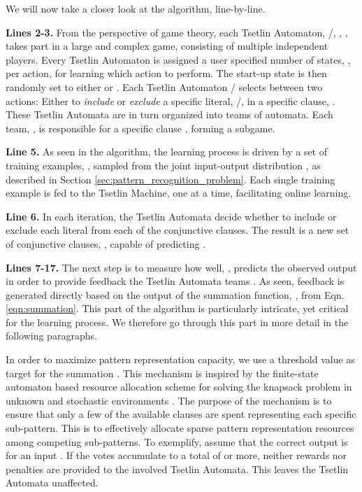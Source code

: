 \documentclass[11pt,a4paper]{article}
\begin{document}
We will now take a closer look at the algorithm, line-by-line.

{\bf Lines 2-3.} From the perspective of game theory, each Tsetlin Automaton, /, , , takes part in a large and complex game, consisting of multiple independent players. Every Tsetlin Automaton is assigned a user specified number of states, , per action, for learning which action to perform. The start-up state is then randomly set to either  or . Each Tsetlin Automaton / selects between two actions: Either to \emph{include} or \emph{exclude} a specific literal, /, in a specific clause, . These Tsetlin Automata are in turn organized into teams of  automata. Each team,  , is responsible for a specific clause , forming a subgame.

{\bf Line 5.} As seen in the algorithm, the learning process is driven by a set of training examples, , sampled from the joint input-output distribution , as described in Section \ref{sec:pattern_recognition_problem}. Each single training example  is fed to the Tsetlin Machine, one at a time, facilitating online learning.

{\bf Line 6.}  In each iteration, the Tsetlin Automata decide whether to include or exclude each literal from each of the conjunctive clauses. The result is a new  set of conjunctive clauses, , capable of predicting .

{\bf Lines 7-17.} The next step is to measure how well, , predicts the observed output  in order to provide feedback the Tsetlin Automata teams . As seen, feedback is generated directly based on the output of the summation function, , from Eqn. \ref{eqn:summation}. This part of the algorithm is particularly intricate, yet critical for the learning process. We therefore go through this part in more detail in the following paragraphs.

In order to maximize pattern representation capacity, we use a threshold value  as target for the summation . This mechanism is inspired by the finite-state automaton based resource allocation scheme for solving the knapsack problem in unknown and stochastic environments \cite{Granmo2007d}. The purpose of the mechanism is to ensure that only a few of the available clauses are spent representing each specific sub-pattern. This is to effectively allocate sparse pattern representation resources among competing sub-patterns. To exemplify, assume that the correct output is  for an input . If the votes accumulate to a total of  or more, neither rewards nor penalties are provided to the involved Tsetlin Automata. This leaves the Tsetlin Automata unaffected.
\\
\\
\\
\end{document}
